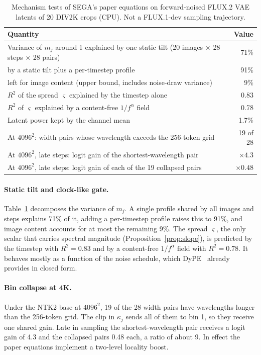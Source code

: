\begin{table}[t]
\centering
\small
\caption{Mechanism tests of SEGA's paper equations on forward-noised FLUX.2 VAE latents of 20 DIV2K crops (CPU). Not a FLUX.1-dev sampling trajectory.}
\label{tab:sega-mech}
\begin{tabular}{@{}lr@{}}
\toprule
Quantity & Value \\
\midrule
Variance of $m_j$ around 1 explained by one static tilt (20 images $\times$ 28 steps $\times$ 28 pairs) & 71\% \\
\quad by a static tilt plus a per-timestep profile & 91\% \\
\quad left for image content (upper bound, includes noise-draw variance) & 9\% \\
$R^2$ of the spread $\varsigma$ explained by the timestep alone & 0.83 \\
$R^2$ of $\varsigma$ explained by a content-free $1/f^\alpha$ field & 0.78 \\
Latent power kept by the channel mean & 1.7\% \\
\midrule
At $4096^2$: width pairs whose wavelength exceeds the 256-token grid & 19 of 28 \\
At $4096^2$, late steps: logit gain of the shortest-wavelength pair & $\times4.3$ \\
At $4096^2$, late steps: logit gain of each of the 19 collapsed pairs & $\times0.48$ \\
\bottomrule
\end{tabular}
\end{table}

\paragraph{Static tilt and clock-like gate.}
Table~\ref{tab:sega-mech} decomposes the variance of $m_j$. A single profile shared by all images and steps explains 71\% of it, adding a per-timestep profile raises this to 91\%, and image content accounts for at most the remaining 9\%. The spread $\varsigma$, the only scalar that carries spectral magnitude (Proposition~\ref{prop:slope}), is predicted by the timestep with $R^2=0.83$ and by a content-free $1/f^\alpha$ field with $R^2=0.78$. It behaves mostly as a function of the noise schedule, which DyPE~\citep{issachar2025dype} already provides in closed form.

\paragraph{Bin collapse at 4K.}
Under the NTK2 base at $4096^2$, 19 of the 28 width pairs have wavelengths longer than the 256-token grid. The clip in $\kappa_j$ sends all of them to bin 1, so they receive one shared gain. Late in sampling the shortest-wavelength pair receives a logit gain of 4.3 and the collapsed pairs 0.48 each, a ratio of about 9. In effect the paper equations implement a two-level locality boost.

